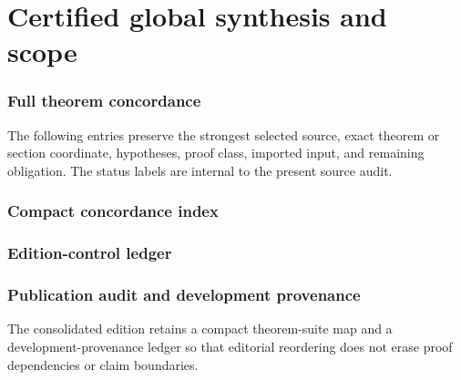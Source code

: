 \documentclass[11pt]{article}
\theoremstyle{definition}
\theoremstyle{remark}
\begin{document}








\part{Certified global synthesis and scope}










\appendix

\section{Full theorem concordance}
\label{app:full-concordance}

The following entries preserve the strongest selected source, exact theorem or section coordinate, hypotheses, proof class, imported input, and remaining obligation. The status labels are internal to the present source audit.



\clearpage
\section{Compact concordance index}


\clearpage
\section{Edition-control ledger}


\clearpage
\section{Publication audit and development provenance}
\label{app:block15-publication-audit}

The consolidated edition retains a compact theorem-suite map and a development-provenance ledger so that editorial reordering does not erase proof dependencies or claim boundaries.
\end{document}
